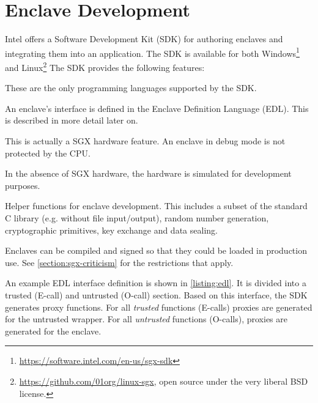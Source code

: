 \section{Enclave Development\label{ID_816398624}\label{section:sgx-usage}}
Intel offers a Software Development Kit (SDK) for authoring enclaves and integrating them into an application.\label{ID_137499231}
The SDK is available for both Windows\footnote{\url{https://software.intel.com/en-us/sgx-sdk}} and Linux\footnote{\url{https://github.com/01org/linux-sgx}, open source under the very liberal BSD license.}\label{ID_1174967909}
The SDK provides the following features:\cite{sgx-windows,sgx-dev}\label{ID_1326046724}
\begin{description}\label{ID_1382376973}
\item[C and C++:] These are the only programming languages supported by the SDK.\label{ID_983565268}
\item[Interface definition:] An enclave's interface is defined in the Enclave Definition Language (EDL). This is described in more detail later on.\label{ID_378071151}
\item[Debugging:] This is actually a SGX hardware feature. An enclave in debug mode is not protected by the CPU.\label{ID_362995137}
\item[Simulation mode:] In the absence of SGX hardware, the hardware is simulated for development purposes.\label{ID_72514973}
\item[Trusted library:] Helper functions for enclave development. This includes a subset of the standard C library (e.g. without file input/output), random number generation, cryptographic primitives, key exchange and data sealing.\label{ID_1393938905}
\item[Complete authoring chain:] Enclaves can be compiled and signed so that they could be loaded in production use. See \autoref{section:sgx-criticism} for the restrictions that apply.\label{ID_237639086}
\end{description}\label{ID_934385781}
An example EDL interface definition is shown in \autoref{listing:edl}.\label{ID_614448952}
It is divided into a trusted (E-call) and untrusted (O-call) section.\label{ID_1379790192}
Based on this interface, the SDK generates proxy functions. For all \textit{trusted} functions (E-calls) proxies are generated for the untrusted wrapper. For all \textit{untrusted} functions (O-calls), proxies are generated for the enclave.\label{ID_1582039127}

